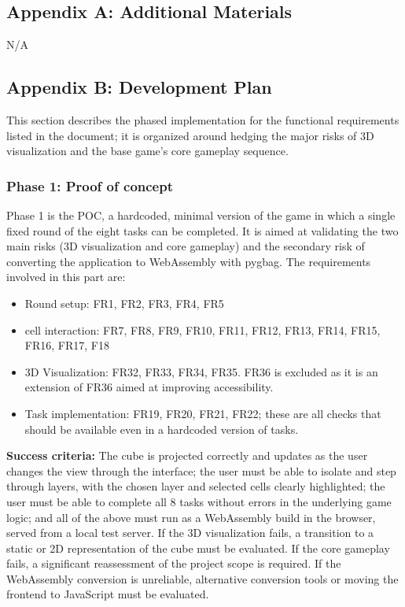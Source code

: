 \documentclass[12pt]{article}
\begin{document}
\subsection{Appendix A: Additional Materials}

N/A

\subsection{Appendix B: Development Plan}

This section describes the phased implementation for the functional requirements listed in the document; it is
organized around hedging the major risks of 3D visualization and the base game's core gameplay sequence.

\subsubsection{Phase 1: Proof of concept}

 Phase 1 is the POC, a hardcoded, minimal version of the game in which a single fixed round of the eight tasks can be completed. It is aimed at validating the two main risks (3D visualization and core gameplay) and the secondary risk of converting the application to WebAssembly with pygbag.
 The requirements involved in this part are: 
  \begin{itemize}
  \item Round setup: FR1, FR2, FR3, FR4, FR5 
  \item cell interaction: FR7, FR8, FR9, FR10, FR11, FR12, FR13, FR14, FR15, FR16, FR17, F18
  \item 3D Visualization: FR32, FR33, FR34, FR35. FR36 is excluded as it is an extension of FR36 aimed at improving accessibility.
  \item Task implementation: FR19, FR20, FR21, FR22; these are all checks that should be available even in a hardcoded version of tasks.
  \end{itemize}

  \textbf{Success criteria:} The cube is projected correctly and updates as the user changes the view through the interface; the user must be able to isolate and step through layers, with the chosen layer
  and selected cells clearly highlighted; the user must be able to complete
  all 8 tasks without errors in the underlying game logic; and all of the above must run as a WebAssembly build in the browser, served from a local test server.
  If the 3D visualization fails, a transition to a static or 2D representation of the cube must be evaluated. If the core gameplay fails, a significant reassessment
  of the project scope is required. If the WebAssembly conversion is unreliable, alternative conversion tools or moving the frontend to JavaScript must be evaluated.
\end{document}
